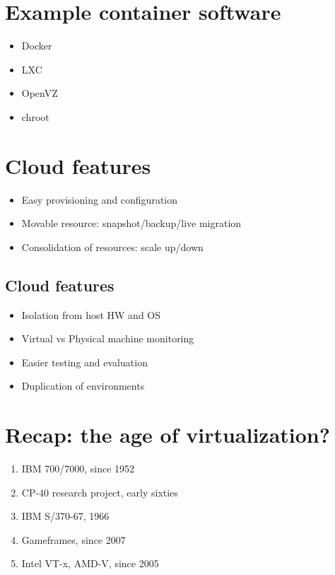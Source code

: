 \documentclass[11pt]{article}
\begin{document}
\section*{Example container software}
\label{sec:org82eef8c}
\begin{itemize}
\item Docker
\item LXC
\item OpenVZ
\item chroot
\end{itemize}

\section*{Cloud features}
\label{sec:org047efe8}
\begin{itemize}
\item Easy provisioning and configuration
\item Movable resource: snapshot/backup/live migration
\item Consolidation of resources: scale up/down
\end{itemize}

\subsection*{Cloud features}
\label{sec:org6784578}
\begin{itemize}
\item Isolation from host HW and OS
\item Virtual vs Physical machine monitoring
\item Easier testing and evaluation
\item Duplication of environments
\end{itemize}

\section*{Recap: the age of virtualization?}
\label{sec:org53f6e3f}
\begin{enumerate}
\item IBM 700/7000, since 1952
\item CP-40 research project, early sixties
\item IBM S/370-67, 1966
\item Gameframes, since 2007
\item Intel VT-x, AMD-V, since 2005
\end{enumerate}
\end{document}
